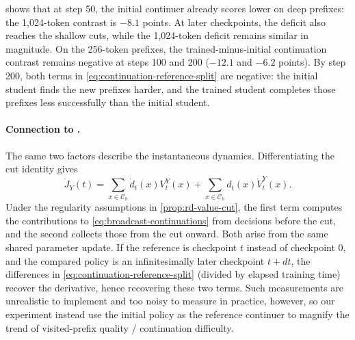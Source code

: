  shows that at step 50, the initial continuer already scores lower on deep prefixes: the 1,024-token contrast is $-8.1$ points. At later checkpoints, the deficit also reaches the shallow cuts, while the 1,024-token deficit remains similar in magnitude. On the 256-token prefixes, the trained-minus-initial continuation contrast remains negative at steps 100 and 200 ($-12.1$ and $-6.2$ points). By step 200, both terms in \cref{eq:continuation-reference-split} are negative: the initial student finds the new prefixes harder, and the trained student completes those prefixes less successfully than the initial student.

\paragraph{Connection to .}
The same two factors describe the instantaneous dynamics. Differentiating the cut identity gives
\begin{equation}
 \dot J_Y(t)=\sum_{x\in\mathcal C_h}\dot d_t(x)V_t^Y(x)+\sum_{x\in\mathcal C_h}d_t(x)\dot V_t^Y(x).
 \label{eq:continuation-infinitesimal}
\end{equation}
Under the regularity assumptions in \cref{prop:rd-value-cut}, the first term computes the contributions to \cref{eq:broadcast-continuations} from decisions before the cut, and the second collects those from the cut onward. Both arise from the same shared parameter update. If the reference is checkpoint $t$ instead of checkpoint 0, and the compared policy is an infinitesimally later checkpoint $t+dt$, the differences in \cref{eq:continuation-reference-split} (divided by elapsed training time) recover the derivative, hence recovering these two terms. Such measurements are unrealistic to implement and too noisy to measure in practice, however, so our experiment instead use the initial policy as the reference continuer to magnify the trend of visited-prefix quality / continuation difficulty.

